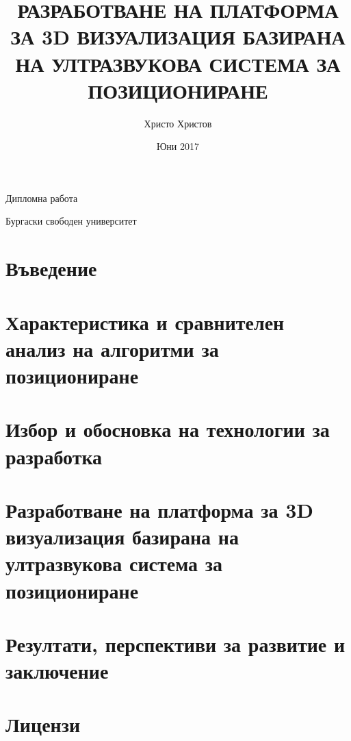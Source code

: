 \documentclass{article}
\title{РАЗРАБОТВАНЕ НА ПЛАТФОРМА ЗА 3D ВИЗУАЛИЗАЦИЯ БАЗИРАНА НА УЛТРАЗВУКОВА СИСТЕМА ЗА ПОЗИЦИОНИРАНЕ}
\author{Христо Христов}
\date{Юни 2017}
\begin{document}
\maketitle

\centerline{\large{Дипломна работа}}
\centerline{\large{Бургаски свободен университет}}

\tableofcontents

\pagebreak
\section{Въведение}



\pagebreak
\section{Характеристика и сравнителен анализ на алгоритми за позициониране}



\pagebreak
\section{Избор и обосновка на технологии за разработка}


\pagebreak
\section{Разработване на платформа за 3D визуализация базирана на ултразвукова система за позициониране}


\pagebreak
\section{Резултати, перспективи за развитие и заключение}


\pagebreak
\section{Лицензи}


\printbibliography
\end{document}
